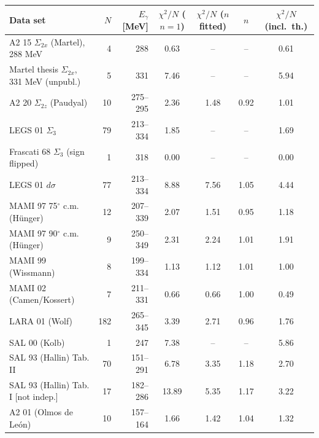 \begin{tabular}{lrrcccc}
\hline
Data set & $N$ & $E_\gamma$ [MeV] & $\chi^2/N$ ($n=1$) & $\chi^2/N$ ($n$ fitted) & $n$ & $\chi^2/N$ (incl.\ th.)\\
\hline
A2 15 $\Sigma_{2x}$ (Martel), 288 MeV & 4 & 288 & 0.63 & -- & -- & 0.61\\
Martel thesis $\Sigma_{2x}$, 331 MeV (unpubl.) & 5 & 331 & 7.46 & -- & -- & 5.94\\
A2 20 $\Sigma_{2z}$ (Paudyal) & 10 & 275--295 & 2.36 & 1.48 & 0.92 & 1.01\\
LEGS 01 $\Sigma_3$ & 79 & 213--334 & 1.85 & -- & -- & 1.69\\
Frascati 68 $\Sigma_3$ (sign flipped) & 1 & 318 & 0.00 & -- & -- & 0.00\\
LEGS 01 $d\sigma$ & 77 & 213--334 & 8.88 & 7.56 & 1.05 & 4.44\\
MAMI 97 75$^\circ$ c.m. (H\"unger) & 12 & 207--339 & 2.07 & 1.51 & 0.95 & 1.18\\
MAMI 97 90$^\circ$ c.m. (H\"unger) & 9 & 250--349 & 2.31 & 2.24 & 1.01 & 1.91\\
MAMI 99 (Wissmann) & 8 & 199--334 & 1.13 & 1.12 & 1.01 & 1.00\\
MAMI 02 (Camen/Kossert) & 7 & 211--331 & 0.66 & 0.66 & 1.00 & 0.49\\
LARA 01 (Wolf) & 182 & 265--345 & 3.39 & 2.71 & 0.96 & 1.76\\
SAL 00 (Kolb) & 1 & 247 & 7.38 & -- & -- & 5.86\\
SAL 93 (Hallin) Tab. II & 70 & 151--291 & 6.78 & 3.35 & 1.18 & 2.70\\
SAL 93 (Hallin) Tab. I [not indep.] & 17 & 182--286 & 13.89 & 5.35 & 1.17 & 3.22\\
A2 01 (Olmos de Le\'on) & 10 & 157--164 & 1.66 & 1.42 & 1.04 & 1.32\\
\hline
\end{tabular}
